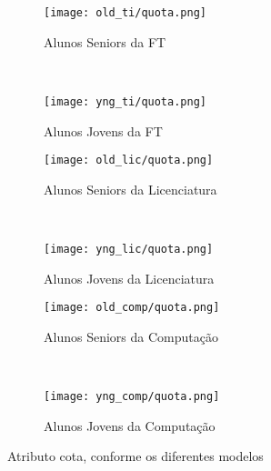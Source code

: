 \clearpage
\begin{figure}[!ht]
    \centering
    \begin{subfigure}[b]{0.48\textwidth}
        \centering
        \texttt{[image: old\_ti/quota.png]}
        \caption{Alunos Seniors da FT}
    \end{subfigure}
    ~
    \begin{subfigure}[b]{0.48\textwidth}
        \centering
        \texttt{[image: yng\_ti/quota.png]}
        \caption{Alunos Jovens da FT}
    \end{subfigure}

    \begin{subfigure}[b]{0.48\textwidth}
        \centering
        \texttt{[image: old\_lic/quota.png]}
        \caption{Alunos Seniors da Licenciatura}
    \end{subfigure}
    ~
    \begin{subfigure}[b]{0.48\textwidth}
        \centering
        \texttt{[image: yng\_lic/quota.png]}
        \caption{Alunos Jovens da Licenciatura}
    \end{subfigure}

    \begin{subfigure}[b]{0.48\textwidth}
        \centering
        \texttt{[image: old\_comp/quota.png]}
        \caption{Alunos Seniors da Computação}
    \end{subfigure}
    ~
    \begin{subfigure}[b]{0.48\textwidth}
        \centering
        \texttt{[image: yng\_comp/quota.png]}
        \caption{Alunos Jovens da Computação}
    \end{subfigure}
    \caption{Atributo cota, conforme os diferentes modelos}
\end{figure}

